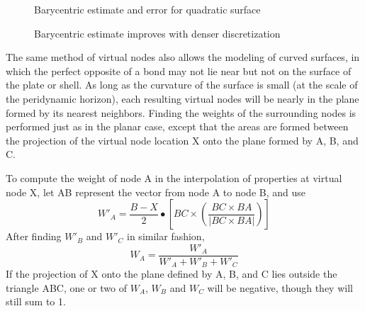\begin{figure}[htbp]
  \centering
  \resizebox{0.8\linewidth}{!}{}
  \caption{Barycentric estimate and error for quadratic surface}
  \label{fig:baryPatch}
\end{figure}

\begin{figure}[htbp]
  \centering
  \resizebox{0.8\linewidth}{!}{}
  \caption{Barycentric estimate improves with denser discretization}
  \label{fig:baryPatch2}
\end{figure}

The same method of virtual nodes also allows the modeling of curved surfaces, in which the perfect opposite of a bond may not lie near but not on the surface of the plate or shell.
As long as the curvature of the surface is small (at the scale of the peridynamic horizon), each resulting virtual nodes will be nearly in the plane formed by its nearest neighbors.
Finding the weights of the surrounding nodes is performed just as in the planar case, except that the areas are formed between the projection of the virtual node location X onto the plane formed by A, B, and C.

%  

To compute the weight of node A in the interpolation of properties at virtual node X, let AB represent the vector from node A to node B, and use
%
\begin{equation}
\label{eq:BarycentricArea}
W'_A = \frac{B-X}{2}\bullet \left[BC \times \left(\frac{BC \times BA}{|BC \times BA|}\right)\right]
\end{equation}
%
After finding $W'_B$ and $W'_C$ in similar fashion,
%
\begin{equation}
\label{eq:BarycentricWeight}
W_A = \frac{W'_A }{W'_A + W'_B + W'_C}
\end{equation}
%
If the projection of X onto the plane defined by A, B, and C lies outside the triangle ABC,  one or two of $W_A$, $W_B$ and $W_C$ will be negative, though they will still sum to 1.

